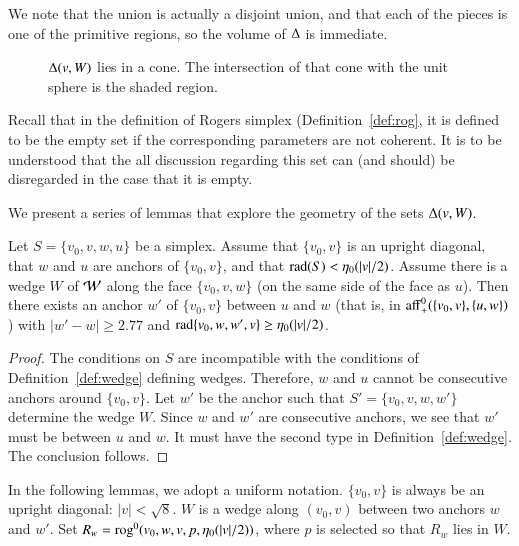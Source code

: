 \begin{remark} We note that the union is actually a disjoint union,
and that each of the pieces is one of the primitive regions, so
the volume of $\Delta$ is immediate.
\end{remark}

\begin{figure}[htb]
  \centering
  \caption{$\Delta(v,W)$ lies in a cone. The intersection of
    that cone with the unit sphere is the shaded region.}
  \label{fig:anchor-quarter}
\end{figure}

\begin{remark}
Recall that in the definition of Rogers simplex (Definition~\ref{def:rog}, 
it is defined to be the
empty set 
if the corresponding parameters are not coherent.  It is to
be understood that the all discussion regarding this set
can (and should) be disregarded in the case that it is empty.
\end{remark}

We present a series of lemmas that explore the geometry of the sets
$\Delta(v,W)$.



\begin{lemma}\label{lemma:new-anchor}
  Let $S=\{v_0,v,w,u\}$ be a simplex.  Assume that $\{v_0,v\}$ is an
upright diagonal, that $w$ and $u$
are anchors of $\{v_0,v\}$, and that $\operatorname{rad}(S)< \eta_0(|v|/2)$.
Assume there is a wedge $W$ of ${\mathcal W}$ along the face $\{v_0,v,w\}$
(on the same side of the face as $u$).  
Then there exists an anchor $w'$ of $\{v_0,v\}$ between $u$ and $w$
(that is, in ${\operatorname{aff}}_+^0(\{v_0,v\},\{u,w\})$) with
    $|w'-w|\ge2.77$ and
    $\operatorname{rad}\{v_0,w,w',v\} \ge \eta_0(|v|/2)$.
\end{lemma}

\begin{proof} The conditions on $S$ are incompatible with the
conditions of Definition~\ref{def:wedge} defining wedges.
Therefore, $w$ and $u$ cannot be consecutive anchors around
$\{v_0,v\}$.  Let $w'$ be the anchor such that $S'=\{v_0,v,w,w'\}$
determine the wedge $W$.  Since $w$ and $w'$ are consecutive anchors,
we see that $w'$ must be between $u$ and $w$.  It must have the
second type in Definition~\ref{def:wedge}.  The conclusion follows.
\end{proof}






In the following lemmas, we adopt a uniform notation.
$\{v_0,v\}$ is always be an upright diagonal: $|v|<\sqrt8$.
$W$ is  a wedge along $(v_0,v)$
between two anchors $w$ and $w'$.  Set $R_w={\operatorname{rog}}^0(v_0,w,v,p,\eta_0(|v|/2))$,
where $p$ is selected so that $R_w$ lies in $W$.


